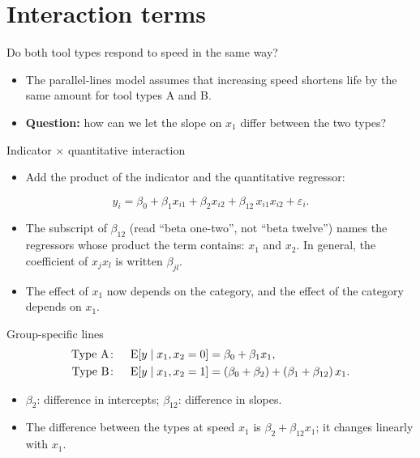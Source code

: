 \section{Interaction terms}


\begin{frame}{Do both tool types respond to speed in the same way?}
    \begin{itemize}
        \item The parallel-lines model assumes that increasing speed shortens life by the same amount for tool types A and B.
        \item \textbf{Question:} how can we let the slope on $x_1$ differ between the two types?
    \end{itemize}
\end{frame}


\begin{frame}{Indicator $\times$ quantitative interaction}
    \begin{itemize}
        \item Add the product of the indicator and the quantitative regressor:
    \end{itemize}
    \[
        y_i = \beta_0 + \beta_1 x_{i1} + \beta_2 x_{i2} + \beta_{12}\, x_{i1} x_{i2} + \varepsilon_i .
    \]
    \begin{itemize}
        \item The subscript of $\beta_{12}$ (read ``beta one-two'', not ``beta twelve'') names the regressors whose product the term contains: $x_1$ and $x_2$. In general, the coefficient of $x_j x_l$ is written $\beta_{jl}$.
        \item The effect of $x_1$ now depends on the category, and the effect of the category depends on $x_1$.
    \end{itemize}
\end{frame}


\begin{frame}{Group-specific lines}
    \begin{align*}
        \text{Type A}\colon \quad \operatorname{E}[y \mid x_1, x_2 = 0] &= \beta_0 + \beta_1 x_1, \\
        \text{Type B}\colon \quad \operatorname{E}[y \mid x_1, x_2 = 1] &= (\beta_0 + \beta_2) + (\beta_1 + \beta_{12})\, x_1 .
    \end{align*}
    \begin{itemize}
        \item $\beta_2$: difference in intercepts; $\beta_{12}$: difference in slopes.
        \item The difference between the types at speed $x_1$ is $\beta_2 + \beta_{12} x_1$; it changes linearly with $x_1$.
    \end{itemize}
\end{frame}


